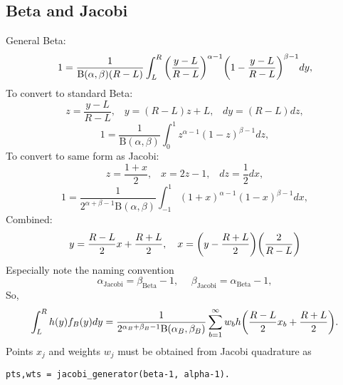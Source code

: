 \documentclass[11pt]{article}
\begin{document}
\subsection{Beta and Jacobi}
General Beta:
\begin{equation}
1=\frac{1}{\text{B}(\alpha,\beta)(R-L)}\int_L^R \qty(\frac{y-L}{R-L})^{\alpha-1}\qty(1-\frac{y-L}{R-L})^{\beta-1}dy,
\end{equation}
To convert to standard Beta:
\begin{equation}
z=\frac{y-L}{R-L},\hspace{10pt}y=(R-L)z+L,\hspace{10pt} dy=(R-L)dz,
\end{equation}
\begin{equation}
1=\frac{1}{\text{B}(\alpha,\beta)}\int_0^1 z^{\alpha-1}(1-z)^{\beta-1}dz,
\end{equation}
To convert to same form as Jacobi:
\begin{equation}
z=\frac{1+x}{2},\hspace{10pt}x=2z-1,\hspace{10pt}dz=\frac{1}{2}dx,
\end{equation}
\begin{equation}
1=\frac{1}{2^{\alpha+\beta-1}\text{B}(\alpha,\beta)}\int_{-1}^1 (1+x)^{\alpha-1}(1-x)^{\beta-1} dx,
\end{equation}
Combined:
\begin{equation}
y=\frac{R-L}{2}x+\frac{R+L}{2},\hspace{10pt}x=\qty(y-\frac{R+L}{2})\qty(\frac{2}{R-L})
\end{equation}
Especially note the naming convention
\begin{equation}
\alpha_\text{Jacobi} = \beta_\text{Beta}-1,\hspace{15pt}\beta_\text{Jacobi} = \alpha_\text{Beta}-1,
\end{equation}
So,
\begin{equation}
\int_L^R h(y)f_B(y)dy = \frac{1}{2^{\alpha_B+\beta_B-1}\text{B}(\alpha_B,\beta_B)}\sum_{b=1}^\infty w_b h\qty(\frac{R-L}{2}x_b+\frac{R+L}{2}).
\end{equation}
Points $x_j$ and weights $w_j$ must be obtained from Jacobi quadrature as
\begin{verbatim}
pts,wts = jacobi_generator(beta-1, alpha-1).
\end{verbatim}
\end{document}
